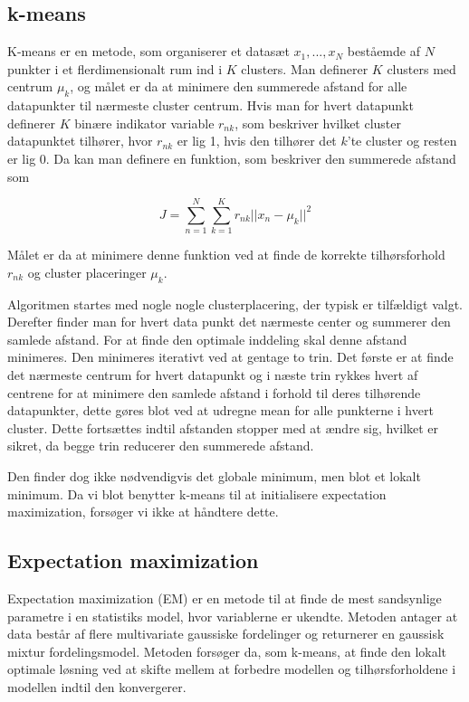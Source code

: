 

\subsection{k-means}

K-means er en metode, som organiserer et datasæt ${x_1,...,x_N}$ beståemde
af $N$ punkter i et flerdimensionalt rum ind i $K$ clusters. Man definerer
$K$ clusters med centrum $\mu_k$, og målet er da at minimere den summerede
afstand for alle datapunkter til nærmeste cluster centrum. Hvis man for hvert
datapunkt definerer $K$ binære indikator variable $r_{nk}$, som beskriver
hvilket cluster datapunktet tilhører, hvor $r_{nk}$ er lig 1, hvis den tilhører
det $k$'te cluster og resten er lig 0. Da kan man definere en funktion, som
beskriver den summerede afstand som

$$
J = \sum_{n=1}^{N} \sum_{k=1}^{K} r_{nk} || x_n - \mu_k ||^2
$$

Målet er da at minimere denne funktion ved at finde de korrekte tilhørsforhold
$r_{nk}$ og cluster placeringer $\mu_k$. 

Algoritmen startes med nogle nogle clusterplacering, der typisk er tilfældigt
valgt. Derefter finder man for hvert data punkt det nærmeste center og
summerer den samlede afstand. For at finde den optimale inddeling skal denne
afstand minimeres. Den minimeres iterativt ved at gentage to trin. Det første
er at finde det nærmeste centrum for hvert datapunkt og i næste trin rykkes
hvert af centrene for at minimere den samlede afstand i forhold til deres
tilhørende datapunkter, dette gøres blot ved at udregne mean for alle
punkterne i hvert cluster. Dette fortsættes indtil afstanden stopper med at
ændre sig, hvilket er sikret, da begge trin reducerer den summerede afstand.

Den finder dog ikke nødvendigvis det globale minimum, men blot et
lokalt minimum. Da vi blot benytter k-means til at initialisere expectation
maximization, forsøger vi ikke at håndtere dette.

\subsection{Expectation maximization}

Expectation maximization (EM) er en metode til at finde de mest sandsynlige
parametre i en statistiks model, hvor variablerne er ukendte. Metoden antager
at data består af flere multivariate gaussiske fordelinger og returnerer en
gaussisk mixtur fordelingsmodel. Metoden forsøger
da, som k-means, at finde den lokalt optimale løsning ved at skifte mellem at
forbedre modellen og tilhørsforholdene i modellen indtil den konvergerer.

